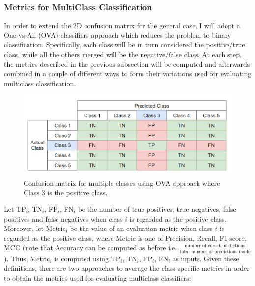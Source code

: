     \subsubsection*{Metrics for MultiClass Classification}
    
    In order to extend the 2D confusion matrix for the general case, I will adopt a One-vs-All (OVA) classifiers approach which reduces the problem to binary classification. Specifically, each class will be in turn considered the positive/true class, while all the others merged will be the negative/false class. At each step, the metrics described in the previous subsection will be computed and afterwards combined in a couple of different ways to form their variations used for evaluating multiclass classification. \\
    
    \begin{figure}[H]
        \centering
        \includegraphics[scale = 0.5]{Images/5dconfusion.png}
        \caption{Confusion matrix for multiple classes using OVA approach where Class 3 is the positive class.}
        \label{5classmatrix}
    \end{figure}
    
    Let TP$_i$, TN$_i$, FP$_i$, FN$_i$ be the number of true positives, true negatives, false positives and false negatives when class $i$ is regarded as the positive class. Moreover, let Metric$_i$ be the value of an evaluation metric when class $i$ is regarded as the positive class, where Metric is one of Precision, Recall, F1 score, MCC (note that Accuracy can be computed as before i.e. $ \frac{\text{number of corect predictions}}{\text{total number of predictions made}}$). Thus, Metric$_i$ is computed using TP$_i$, TN$_i$, FP$_i$, FN$_i$ as inputs. Given these definitions, there are two approaches to average the class specific metrics in order to obtain the metrics used for evaluating multiclass classifiers: \\
    
